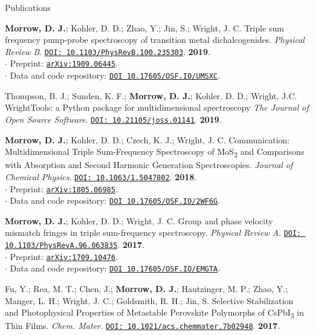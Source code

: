 \documentclass{resume} %
\begin{document}
\begin{rSection}{Publications}
\begin{etaremune}
\item  \textbf{Morrow, D. J.}; Kohler, D. D.; Zhao, Y.; Jin, S.; Wright, J. C. Triple sum frequency pump-probe spectroscopy of transition metal dichalcogenides. \emph{Physical Review B}. \href{https://journals.aps.org/pra/abstract/10.1103/PhysRevB.100.235303}{\texttt{DOI: 10.1103/PhysRevB.100.235303}}. \textbf{2019}.\\
$\cdot$ Preprint: \href{http://arxiv.org/abs/1909.06445}{\texttt{arXiv:1909.06445}}. \\
$\cdot$ Data and code repository: \href{https://osf.io/UMSXC/}{\texttt{DOI 10.17605/OSF.IO/UMSXC}}.

\item Thompson, B. J.; Sunden, K. F.; \textbf{Morrow, D. J.}; Kohler, D. D.; Wright, J.C. 
WrightTools: a Python package for multidimensional spectroscopy \emph{The Journal of Open Source Software}. 
\href{http://doi.org/10.21105/joss.01141}{\texttt{DOI: 10.21105/joss.01141}}. \textbf{2019}.
	
\item \textbf{Morrow, D. J.}; Kohler, D. D.; Czech, K. J.; Wright, J. C. 
Communication: Multidimensional Triple Sum-Frequency Spectroscopy of MoS\textsubscript{2} and Comparisons with Absorption and Second Harmonic Generation Spectroscopies. \emph{Journal of Chemical Physics}. \href{http://doi.org/10.1063/1.5047802}{\texttt{DOI: 10.1063/1.5047802}}. \textbf{2018}.\\
$\cdot$ Preprint: \href{http://arxiv.org/abs/1805.06985}{\texttt{arXiv:1805.06985}}. \\
$\cdot$ Data and code repository: \href{https://osf.io/2wf6g/}{\texttt{DOI 10.17605/OSF.IO/2WF6G}}.
	
\item \textbf{Morrow, D. J.}; Kohler, D. D.; Wright, J. C. Group and phase velocity mismatch fringes in triple sum-frequency spectroscopy. \emph{Physical Review A}. \href{https://journals.aps.org/pra/abstract/10.1103/PhysRevA.96.063835}{\texttt{DOI: 10.1103/PhysRevA.96.063835}}. \textbf{2017}.\\
$\cdot$ Preprint: \href{http://arxiv.org/abs/1709.10476}{\texttt{arXiv:1709.10476}}. \\
$\cdot$ Data and code repository: \href{https://osf.io/emgta/}{\texttt{DOI 10.17605/OSF.IO/EMGTA}}.

\item Fu, Y.; Rea, M. T.; Chen, J.; \textbf{Morrow, D. J.}; Hautzinger, M. P.; Zhao, Y.; Manger, L. H.; Wright, J. C.; Goldsmith, R. H.; Jin, S. Selective Stabilization and Photophysical Properties of
Metastable Perovskite Polymorphs of CsPbI\textsubscript{3} in Thin Films. \emph{Chem. Mater.} \href{http://pubs.acs.org/doi/10.1021/acs.chemmater.7b02948}{\texttt{DOI: 10.1021/acs.chemmater.7b02948}}. \textbf{2017}. 
 

\end{etaremune}
\end{rSection}
\end{document}
